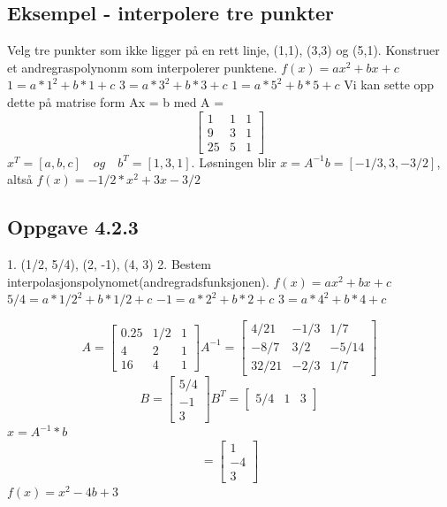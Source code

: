 \documentclass[a4paper,norsk]{article}
\begin{document}
\subsection{Eksempel - interpolere tre punkter}
Velg tre punkter som ikke ligger på en rett linje, (1,1), (3,3) og (5,1). Konstruer et andregraspolynonm som interpolerer punktene.\newline
\(f(x) = ax^2 + bx + c\)\newline
\(1 = a * 1^2 + b * 1 + c\)\newline
\(3 = a * 3^2 + b * 3 + c\)\newline
\(1 = a * 5^2 + b*5 + c\)\newline
Vi kan sette opp dette på matrise form Ax = b med 
A = \begin{equation*}\begin{bmatrix}1 &1 & 1\\9 & 3 & 1 \\ 25 & 5 & 1\end{bmatrix}\end{equation*}
\( x^T = [a,b,c] \quad og \quad b^T = [1,3,1].\) Løsningen blir \(x = A^{-1} b = [-1/3, 3, -3/2]\), altså \(f(x) = -1/2*x^2 + 3x - 3/2\) 
\subsection{Oppgave 4.2.3}
1.
(1/2, 5/4), (2, -1), (4, 3)
2. Bestem interpolasjonspolynomet(andregradsfunksjonen).
\(f(x) = ax^2 + bx + c\)\newline
\(5/4 = a * 1/2^2 + b * 1/2 + c\)\newline
\(-1 = a * 2^2 + b * 2 + c\)\newline
\(3 = a * 4^2 + b*4 + c\)\newline

\begin{equation*}
A = \begin{bmatrix} 0.25 & 1/2 & 1 \\ 4 & 2 & 1 \\ 16 & 4 & 1  \end{bmatrix} A^{-1} =  \begin{bmatrix} 4/21 & -1/3 & 1/7 \\ -8/7 & 3/2 & -5/14 \\ 32/21 & -2/3 & 1/7\end{bmatrix}
\end{equation*}
\begin{equation*}
B = \begin{bmatrix} 5/4 \\ -1 \\ 3  \end{bmatrix} B^T = \begin{bmatrix} 5/4 & 1 & 3  \end{bmatrix}
\end{equation*}
\(x = A^{-1} * b\)
\begin{equation*} = \begin{bmatrix} 1 \\ -4 \\ 3  \end{bmatrix}
\end{equation*}
\(f(x) =  x^2 - 4b + 3  \)
\end{document}
